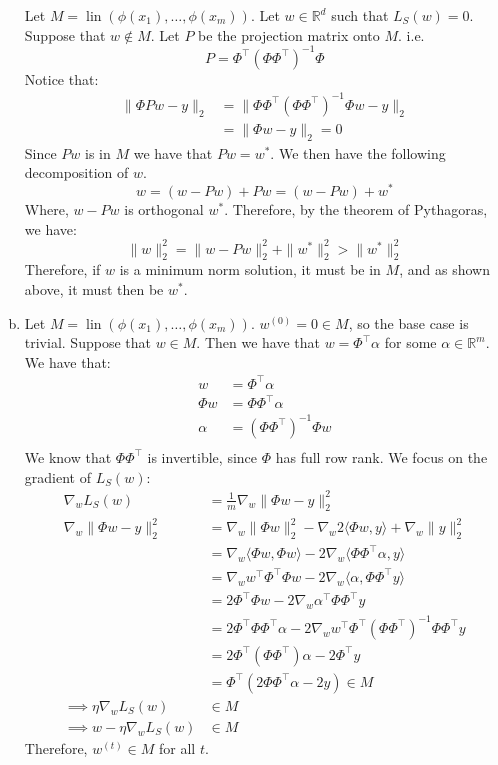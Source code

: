 \documentclass{amsart}
\newcommand{\rr}{\mathbb R}    %
\DeclareMathOperator{\lin}{lin}
\theoremstyle{definition}
\begin{document}
\begin{enumerate}[(a)]
    Let $M = \lin(\phi(x_1), \ldots, \phi(x_m))$. Let $w \in \rr^d$ such that $L_S(w) = 0$. 
    Suppose that $w \not \in M$. Let $P$ be the projection matrix onto $M$. i.e. 
    \[P = \Phi^\top(\Phi\Phi^\top)^{-1}\Phi\]
    Notice that:
    \begin{align*}
      \|\Phi P w - y\|_2 &= \| \Phi \Phi^\top (\Phi \Phi^\top)^{-1}\Phi w - y\|_2\\
      &= \|\Phi w - y\|_2 = 0
    \end{align*}
    Since $Pw$ is in $M$ we have that $Pw = w^\ast$. We then have the following decomposition of $w$.
    \[w = (w - Pw) + Pw = (w - Pw) + w^\ast\]
    Where, $w - Pw$ is orthogonal $w^\ast$. Therefore, by the theorem of Pythagoras, we have:
    \[\|w\|_2^2 = \|w - Pw\|_2^2 + \|w^\ast\|_2^2 > \|w^\ast\|_2^2\]
    Therefore, if $w$ is a minimum norm solution, it must be in $M$, and as shown above, it must then be $w^\ast$.
  \item
    Let $M = \lin(\phi(x_1), \ldots, \phi(x_m))$. $w^{(0)} = 0 \in M$, so the base case is trivial.
    Suppose that $w\in M$. Then we have that $w = \Phi^\top \alpha$ for some $\alpha \in \rr^m$.
    We have that:
    \begin{align*}
      w &= \Phi^\top \alpha\\
      \Phi w &= \Phi \Phi^\top \alpha\\
      \alpha &= (\Phi \Phi^\top)^{-1} \Phi w\\
    \end{align*}
    We know that $\Phi \Phi^\top$ is invertible, since $\Phi$ has full row rank. We focus on the gradient of $L_S(w)$:
    \begin{align*}
      \nabla_w L_S(w) &= \frac{1}{m}  \nabla_w \|\Phi w - y\|_2^2\\
      \nabla_w \|\Phi w - y\|_2^2 &= \nabla_w \|\Phi w \|_2^2 - \nabla_w 2 \langle \Phi w, y \rangle + \nabla_w \|y\|_2^2\\
      &= \nabla_w \langle \Phi w, \Phi w \rangle - 2 \nabla_w \langle \Phi \Phi^\top \alpha, y \rangle\\
      &= \nabla_w w^\top \Phi^\top \Phi w - 2 \nabla_w \langle \alpha, \Phi \Phi^\top y \rangle\\
      &= 2 \Phi^\top \Phi w - 2 \nabla_w \alpha^\top \Phi \Phi^\top y\\
      &= 2 \Phi^\top \Phi \Phi^\top \alpha - 2 \nabla_w w^\top \Phi^\top (\Phi \Phi^\top)^{-1} \Phi \Phi^\top y\\
      &= 2 \Phi^\top (\Phi \Phi^\top) \alpha - 2 \Phi^\top y\\
      &= \Phi^\top (2 \Phi \Phi^\top \alpha - 2 y) \in M\\
      \implies \eta \nabla_w L_S(w) &\in M\\
      \implies w - \eta \nabla_w L_S(w) &\in M
    \end{align*}
    Therefore, $w^{(t)} \in M$ for all $t$.


\end{enumerate}
\end{document}
